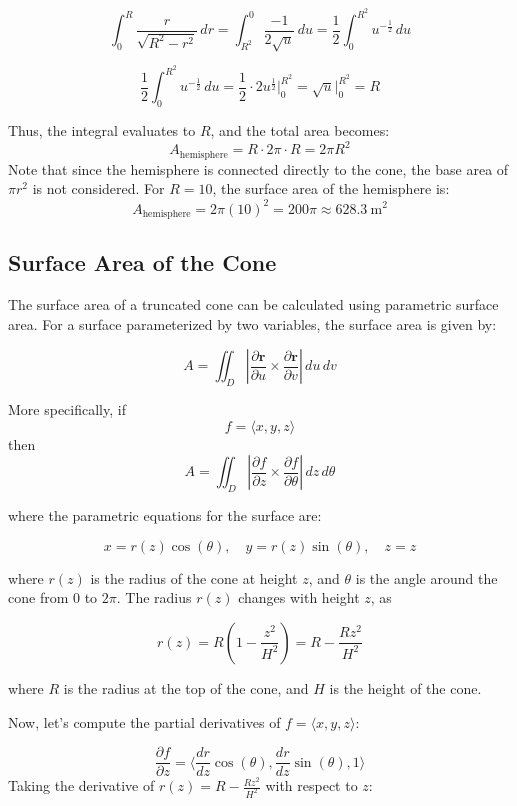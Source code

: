 \documentclass{article}
\begin{document}
\[
\int_0^{R} \frac{r}{\sqrt{R^2 - r^2}} \, dr = \int_{R^2}^0 \frac{-1}{2 \sqrt{u}} \, du = \frac{1}{2} \int_0^{R^2} u^{-\frac{1}{2}} \, du
\]

\[
\frac{1}{2} \int_0^{R^2} u^{-\frac{1}{2}} \, du = \frac{1}{2} \cdot 2 u^{\frac{1}{2}} \Big|_0^{R^2} = \sqrt{u} \Big|_0^{R^2} = R
\]

Thus, the integral evaluates to \( R \), and the total area becomes:
\[
A_{\text{hemisphere}} = R \cdot 2\pi \cdot R = 2\pi R^2
\]
Note that since the hemisphere is connected directly to the cone, the base area of $\pi r^2$ is not considered. For \( R = 10 \), the surface area of the hemisphere is:
\[
A_{\text{hemisphere}} = 2\pi (10)^2 = 200\pi \approx 628.3 \ \text{m} ^2 
\] 
\subsection*{Surface Area of the Cone}
The surface area of a truncated cone can be calculated using parametric surface area. For a surface parameterized by two variables, the surface area is given by:

\[
A = \iint_D \left| \frac{\partial \mathbf{r}}{\partial u} \times \frac{\partial \mathbf{r}}{\partial v} \right| \, du \, dv
\]

More specifically, if 
\[
f = \langle x, y, z \rangle
\]
then
\[
A = \iint_D \left| \frac{\partial f}{\partial z} \times \frac{\partial f}{\partial \theta} \right| \, dz \, d\theta
\]

where the parametric equations for the surface are:

\[
x = r(z) \cos(\theta), \quad y = r(z) \sin(\theta), \quad z = z
\]

where \( r(z) \) is the radius of the cone at height \( z \), and \( \theta \) is the angle around the cone from \( 0 \) to \( 2\pi \). The radius \( r(z) \) changes with height \( z \), as

\[
r(z) = R \left(1 - \frac{z^2}{H^2}\right) = R - \frac{Rz^2}{H^2}
\]

where \( R \) is the radius at the top of the cone, and \( H \) is the height of the cone.

Now, let's compute the partial derivatives of \( f = \langle x, y, z \rangle \):



\[
\frac{\partial f}{\partial z} = \langle \frac{dr}{dz} \cos(\theta), \frac{dr}{dz} \sin(\theta), 1 \rangle
\]
Taking the derivative of \( r(z) = R - \frac{Rz^2}{H^2} \) with respect to \( z \):
\end{document}
